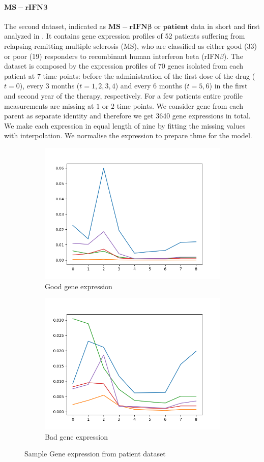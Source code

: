 \paragraph*{$\mathbf{MS-rIFN\beta}$}
The second dataset, indicated as $\mathbf{MS-rIFN\beta}$ or $\mathbf{patient}$ data in short and first analyzed in \cite{second_dataset}. It contains gene expression profiles of 52 patients suffering from relapsing-remitting multiple sclerosis (MS), who are classified as either good (33) or poor (19) responders to recombinant human interferon beta (rIFN$\beta$). The dataset is composed by the expression profiles of $70$ genes isolated from each patient at $7$ time points: before the administration of the first dose of the drug ($t= 0$), every $3$ months ($t=1, 2, 3, 4$) and every $6$ months ($t=5,6$) in the first and second year of the therapy, respectively. For a few patients entire profile measurements are missing at $1$ or $2$ time points. We consider gene  from each parent as separate identity and therefore we get 3640 gene expressions in total. We make each expression in equal length of nine by fitting the missing values with interpolation. We normalise the expression to prepare thme for the model.

\begin{figure}[]
	\centering
	\begin{subfigure}{0.5\columnwidth}
		\centering
		\includegraphics[width=\columnwidth, height=4 cm]{Figures/patient_good_gene.png}
		\caption{Good gene expression}
	\end{subfigure}%
	\begin{subfigure}{0.5\columnwidth}
		\centering
			\includegraphics[width=\columnwidth, height=4 cm]{Figures/patient_bad_gene.png}
		\caption{Bad gene expression}
	\end{subfigure}%
	\caption{Sample Gene expression from patient dataset}
	\label{fig-patient_data}
\end{figure}

